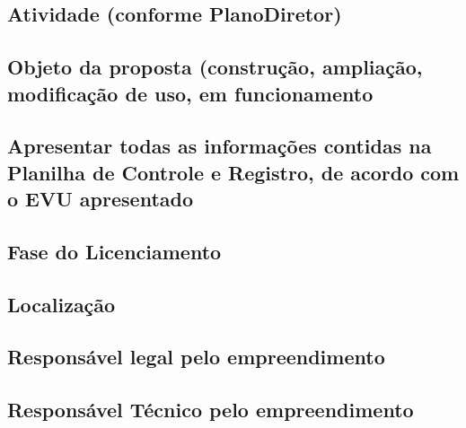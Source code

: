 \documentclass[]{article}
\begin{document}
\hypertarget{atividade-conforme-planodiretor}{%
\subsection{\texorpdfstring{Atividade (conforme
\textbf{PlanoDiretor})}{Atividade (conforme PlanoDiretor)}}\label{atividade-conforme-planodiretor}}

\hypertarget{objeto-da-proposta-construuxe7uxe3o-ampliauxe7uxe3o-modificauxe7uxe3o-de-uso-em-funcionamento}{%
\subsection{Objeto da proposta (construção, ampliação, modificação de
uso, em
funcionamento}\label{objeto-da-proposta-construuxe7uxe3o-ampliauxe7uxe3o-modificauxe7uxe3o-de-uso-em-funcionamento}}

\hypertarget{apresentar-todas-as-informauxe7uxf5es-contidas-na-planilha-de-controle-e-registro-de-acordo-com-o-evu-apresentado}{%
\subsection{Apresentar todas as informações contidas na Planilha de
Controle e Registro, de acordo com o EVU
apresentado}\label{apresentar-todas-as-informauxe7uxf5es-contidas-na-planilha-de-controle-e-registro-de-acordo-com-o-evu-apresentado}}

\hypertarget{fase-do-licenciamento}{%
\subsection{Fase do Licenciamento}\label{fase-do-licenciamento}}

\hypertarget{localizauxe7uxe3o}{%
\subsection{Localização}\label{localizauxe7uxe3o}}

\hypertarget{responsuxe1vel-legal-pelo-empreendimento}{%
\subsection{Responsável legal pelo
empreendimento}\label{responsuxe1vel-legal-pelo-empreendimento}}

\hypertarget{responsuxe1vel-tuxe9cnico-pelo-empreendimento}{%
\subsection{Responsável Técnico pelo
empreendimento}\label{responsuxe1vel-tuxe9cnico-pelo-empreendimento}}
\end{document}
